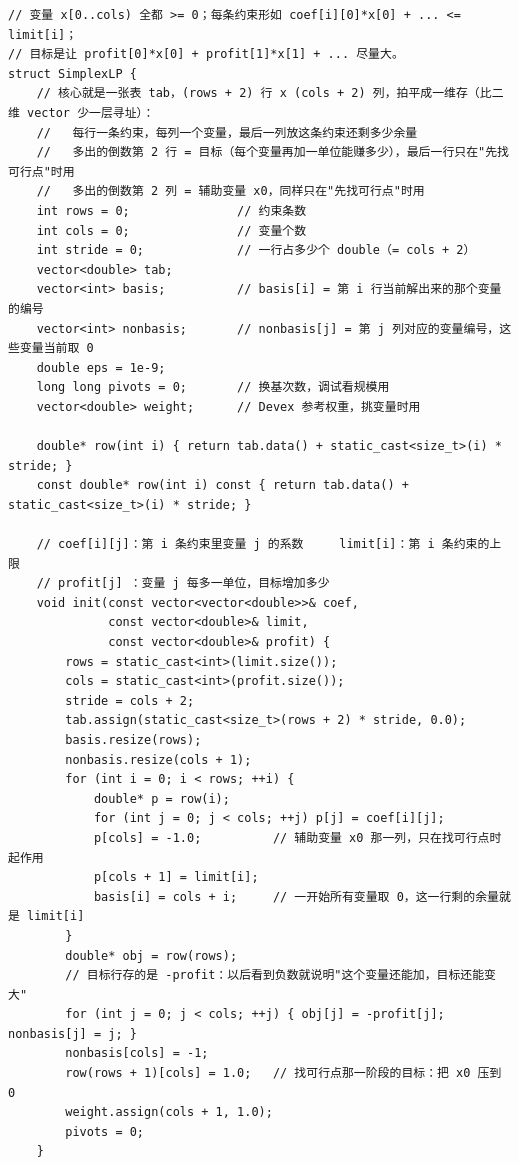 		\begin{verbatim}
// 变量 x[0..cols) 全都 >= 0；每条约束形如 coef[i][0]*x[0] + ... <= limit[i]；
// 目标是让 profit[0]*x[0] + profit[1]*x[1] + ... 尽量大。
struct SimplexLP {
    // 核心就是一张表 tab，(rows + 2) 行 x (cols + 2) 列，拍平成一维存（比二维 vector 少一层寻址）：
    //   每行一条约束，每列一个变量，最后一列放这条约束还剩多少余量
    //   多出的倒数第 2 行 = 目标（每个变量再加一单位能赚多少），最后一行只在"先找可行点"时用
    //   多出的倒数第 2 列 = 辅助变量 x0，同样只在"先找可行点"时用
    int rows = 0;               // 约束条数
    int cols = 0;               // 变量个数
    int stride = 0;             // 一行占多少个 double（= cols + 2）
    vector<double> tab;
    vector<int> basis;          // basis[i] = 第 i 行当前解出来的那个变量的编号
    vector<int> nonbasis;       // nonbasis[j] = 第 j 列对应的变量编号，这些变量当前取 0
    double eps = 1e-9;
    long long pivots = 0;       // 换基次数，调试看规模用
    vector<double> weight;      // Devex 参考权重，挑变量时用

    double* row(int i) { return tab.data() + static_cast<size_t>(i) * stride; }
    const double* row(int i) const { return tab.data() + static_cast<size_t>(i) * stride; }

    // coef[i][j]：第 i 条约束里变量 j 的系数     limit[i]：第 i 条约束的上限
    // profit[j] ：变量 j 每多一单位，目标增加多少
    void init(const vector<vector<double>>& coef,
              const vector<double>& limit,
              const vector<double>& profit) {
        rows = static_cast<int>(limit.size());
        cols = static_cast<int>(profit.size());
        stride = cols + 2;
        tab.assign(static_cast<size_t>(rows + 2) * stride, 0.0);
        basis.resize(rows);
        nonbasis.resize(cols + 1);
        for (int i = 0; i < rows; ++i) {
            double* p = row(i);
            for (int j = 0; j < cols; ++j) p[j] = coef[i][j];
            p[cols] = -1.0;          // 辅助变量 x0 那一列，只在找可行点时起作用
            p[cols + 1] = limit[i];
            basis[i] = cols + i;     // 一开始所有变量取 0，这一行剩的余量就是 limit[i]
        }
        double* obj = row(rows);
        // 目标行存的是 -profit：以后看到负数就说明"这个变量还能加，目标还能变大"
        for (int j = 0; j < cols; ++j) { obj[j] = -profit[j]; nonbasis[j] = j; }
        nonbasis[cols] = -1;
        row(rows + 1)[cols] = 1.0;   // 找可行点那一阶段的目标：把 x0 压到 0
        weight.assign(cols + 1, 1.0);
        pivots = 0;
    }


\end{verbatim}
